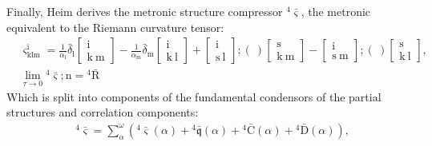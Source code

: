 \documentclass[12pt]{article}
\begin{document}
\begin{itemize}
    Finally, Heim derives the metronic structure compressor \( {}^{4}\bar{\bm{\varsigma}} \), the metronic equivalent to the Riemann curvature tensor:
    \begin{equation}
    \begin{aligned}
    & \varsigma^{\mathrm{i}}_{\mathrm{klm}} = \frac{1}{\alpha_\mathrm{l}} \bar{\delta}_\mathrm{l} \left[ \begin{matrix} \mathrm{i} \\ \mathrm{k\ m} \end{matrix} \right] - \frac{1}{\alpha_\mathrm{m}} \bar{\delta}_\mathrm{m} \left[ \begin{matrix} \mathrm{i} \\ \mathrm{k\ l} \end{matrix} \right] + \left[ \begin{matrix} \mathrm{i} \\ \mathrm{s\ l} \end{matrix} \right] ; (\ ) \left[ \begin{matrix} \mathrm{s} \\ \mathrm{k\ m} \end{matrix} \right] - \left[ \begin{matrix} \mathrm{i} \\ \mathrm{s\ m} \end{matrix} \right] ; (\ ) \left[ \begin{matrix} \mathrm{s} \\ \mathrm{k\ l} \end{matrix} \right], \\
    & \lim_{\tau \to 0} {}^4\bar{\bm{\varsigma}} ; \mathrm{n} = {}^4\bar{\mathrm{R}}
    \end{aligned} \tag{99}
    \label{eq:original_metronized_compressor_limit}
    \end{equation}
    Which is split into components of the fundamental condensors of the partial structures and correlation components:
    \begin{equation}
    \begin{aligned}
    & {}^4\bar{\bm{\varsigma}} = \sum_\alpha^\omega \left( {}^4\bar{\bm{\varsigma}}(\alpha) + {}^4\bar{\mathfrak{q}}(\alpha) + {}^4\bar{\mathrm{C}}(\alpha) + {}^4\bar{\mathrm{D}}(\alpha) \right), \\

\end{aligned}
\end{equation}
\end{itemize}
\end{document}
